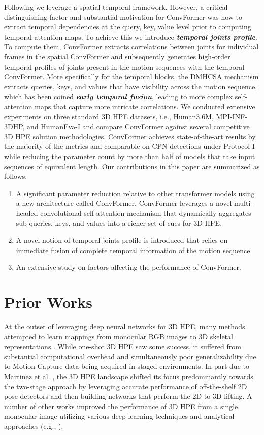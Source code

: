 \documentclass{article}
\begin{document}
Following \cite{ZZMYCD21, li2022mhformer} we leverage a spatial-temporal framework. However, a critical distinguishing factor and substantial motivation for ConvFormer was how to extract temporal dependencies at the query, key, value level prior to computing temporal attention maps. To achieve this we introduce \textbf{\textit{temporal joints profile}}. To compute them, ConvFormer extracts correlations between joints for individual frames in the spatial ConvFormer and subsequently generates high-order temporal profiles of joints present in the motion sequences with the temporal ConvFormer. More specifically for the temporal blocks, the DMHCSA mechanism extracts queries, keys, and values that have visibility across the motion sequence, which has been coined \textbf{\textit{early temporal fusion}}, leading to more complex self-attention maps that capture more intricate correlations. We conducted extensive experiments on three standard 3D HPE datasets, i.e.,  Human3.6M, MPI-INF-3DHP, and HumanEva-I \cite{IPOS13, mono-3dhp2017, SBB10} and compare ConvFormer against several competitive 3D HPE solution methodologies. ConvFormer achieves state-of-the-art results by the majority of the metrics and comparable on CPN detections under Protocol I while reducing the parameter count by more than half of models that take input sequences of equivalent length. Our contributions in this paper are summarized as follows: 


\begin{enumerate}
    \item A significant parameter reduction relative to other transformer models using a new architecture called ConvFormer. ConvFormer leverages a novel multi-headed convolutional self-attention mechanism that dynamically aggregates sub-queries, keys, and values into a richer set of cues for 3D HPE.
    \item A novel notion of temporal joints profile is introduced that relies on immediate fusion of complete temporal information of the motion sequence.
    \item An extensive study on factors affecting the performance of ConvFormer.
\end{enumerate}


\section{Prior Works}
At the outset of leveraging deep neural networks for 3D HPE, many methods attempted to learn mappings from monocular RGB images to 3D skeletal representations \cite{PZDD17,SXWLW17}. While one-shot 3D HPE saw some success, it suffered from substantial computational overhead and simultaneously poor generalizability due to Motion Capture data being acquired in staged environments. In part due to Martinez et al. \cite{MHRL17}, the 3D HPE landscape shifted its focus predominantly towards the two-stage approach by leveraging accurate performance of off-the-shelf 2D pose detectors and then building networks that perform the 2D-to-3D lifting. A number of other works improved the performance of 3D HPE from a single monocular image utilizing various deep learning techniques and analytical approaches (e.g., \cite{SXWLW17,zhou2019hemlets,WHXYS20, D-AMSB21,ZHJJL21}). 
\end{document}
